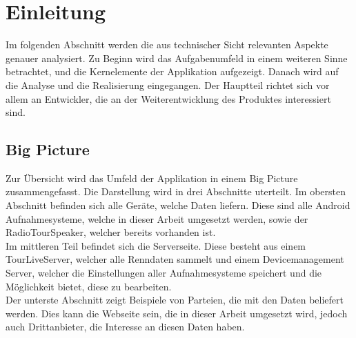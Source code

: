 \chapter{Einleitung}

Im folgenden Abschnitt werden die aus technischer Sicht relevanten Aspekte genauer analysiert. Zu Beginn wird das Aufgabenumfeld in einem weiteren Sinne betrachtet, und die Kernelemente der Applikation aufgezeigt. Danach wird auf die Analyse und die Realisierung eingegangen. Der Hauptteil richtet sich vor allem an Entwickler, die an der Weiterentwicklung des Produktes interessiert sind.

\section{Big Picture}

Zur Übersicht wird das Umfeld der Applikation in einem Big Picture zusammengefasst.
Die Darstellung wird in drei Abschnitte uterteilt. Im obersten Abschnitt befinden sich alle Geräte, welche Daten liefern. Diese sind alle Android Aufnahmesysteme, welche in dieser Arbeit umgesetzt werden, sowie der RadioTourSpeaker, welcher bereits vorhanden ist. \\
Im mittleren Teil befindet sich die Serverseite. Diese besteht aus einem TourLiveServer, welcher alle Renndaten sammelt und einem Devicemanagement Server, welcher die Einstellungen aller Aufnahmesysteme speichert und die Möglichkeit bietet, diese zu bearbeiten.\\
Der unterste Abschnitt zeigt Beispiele von Parteien, die mit den Daten beliefert werden. Dies kann die Webseite sein, die in dieser Arbeit umgesetzt wird, jedoch auch Drittanbieter, die Interesse an diesen Daten haben.

